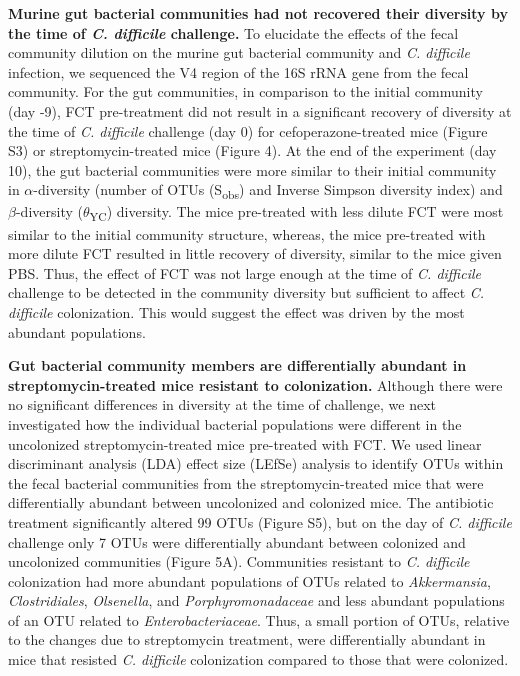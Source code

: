 \documentclass[
  12pt,
]{article}
\begin{document}
\textbf{Murine gut bacterial communities had not recovered their
diversity by the time of \emph{C. difficile} challenge.} To elucidate
the effects of the fecal community dilution on the murine gut bacterial
community and \emph{C. difficile} infection, we sequenced the V4 region
of the 16S rRNA gene from the fecal community. For the gut communities,
in comparison to the initial community (day -9), FCT pre-treatment did
not result in a significant recovery of diversity at the time of
\emph{C. difficile} challenge (day 0) for cefoperazone-treated mice
(Figure S3) or streptomycin-treated mice (Figure 4). At the end of the
experiment (day 10), the gut bacterial communities were more similar to
their initial community in \(\alpha\)-diversity (number of OTUs
(S\textsubscript{obs}) and Inverse Simpson diversity index) and
\(\beta\)-diversity (\(\theta\)\textsubscript{YC}) diversity. The mice
pre-treated with less dilute FCT were most similar to the initial
community structure, whereas, the mice pre-treated with more dilute FCT
resulted in little recovery of diversity, similar to the mice given PBS.
Thus, the effect of FCT was not large enough at the time of \emph{C.
difficile} challenge to be detected in the community diversity but
sufficient to affect \emph{C. difficile} colonization. This would
suggest the effect was driven by the most abundant populations.

\textbf{Gut bacterial community members are differentially abundant in
streptomycin-treated mice resistant to colonization.} Although there
were no significant differences in diversity at the time of challenge,
we next investigated how the individual bacterial populations were
different in the uncolonized streptomycin-treated mice pre-treated with
FCT. We used linear discriminant analysis (LDA) effect size (LEfSe)
analysis to identify OTUs within the fecal bacterial communities from
the streptomycin-treated mice that were differentially abundant between
uncolonized and colonized mice. The antibiotic treatment significantly
altered 99 OTUs (Figure S5), but on the day of \emph{C. difficile}
challenge only 7 OTUs were differentially abundant between colonized and
uncolonized communities (Figure 5A). Communities resistant to \emph{C.
difficile} colonization had more abundant populations of OTUs related to
\emph{Akkermansia}, \emph{Clostridiales}, \emph{Olsenella}, and
\emph{Porphyromonadaceae} and less abundant populations of an OTU
related to \emph{Enterobacteriaceae}. Thus, a small portion of OTUs,
relative to the changes due to streptomycin treatment, were
differentially abundant in mice that resisted \emph{C. difficile}
colonization compared to those that were colonized.
\end{document}
